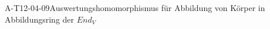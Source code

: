 
\begin{EXA}{A-T12-04-09}{Auswertungshomomorphismus für Abbildung von Körper in Abbildungsring der $End_V$}
\end{EXA}
